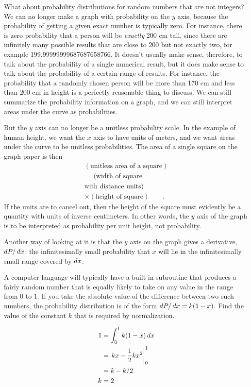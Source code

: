 What about probability distributions for random numbers that
are not integers? We can no longer make a graph with
probability on the $y$ axis, because the probability of
getting a given exact number is typically zero. For
instance, there is zero probability that a person will be
\emph{exactly} 200 cm tall, since there are
infinitely many possible results that are close to 200 but not
exactly two, for example 199.99999999687687658766.
It doesn't usually make sense, therefore, to talk
about the probability of a single numerical result, but it
does make sense to talk about the probability of a certain
range of results. For instance, the probability that a randomly
chosen person will be more than 170 cm and less than 200 cm
in height is a perfectly
reasonable thing to discuss. We can still summarize the
probability information on a graph, and we can still
interpret areas under the curve as probabilities.
%

But the $y$ axis can no longer be a unitless probability
scale. In the example of human height, we want the $x$
axis to have units of meters, and we want areas under the
curve to be unitless probabilities. The area of a single
square on the graph paper is then
\begin{align*}
 (\text{unitless area of a square})\\
         =  (\text{width of square}\\
             \text{with distance units}) \\
             \times (\text{height of square}) \qquad .
\end{align*}
If the units are to cancel out, then the height of the
square must evidently be a quantity with units of inverse
centimeters. In other words, the $y$ axis of the graph is to be
interpreted as probability per unit height, not probability.

Another way of looking at it is that the $y$ axis on the graph
gives a derivative, $\mathop{d\!} P/\mathop{d\!} x$: the infinitesimally small
probability that $x$ will lie in the infinitesimally small
range covered by $\mathop{d\!} x$.

\begin{eg}\label{eg:random-diff}
\egquestion A computer language will typically have a built-in
subroutine that produces a fairly random number that is equally
likely to take on any value in the range from 0 to 1. If you
take the absolute value of the difference between two such
numbers, the probability distribution is of the form
$\mathop{d\!} P/\mathop{d\!} x=k(1-x)$. Find the value of the constant $k$
that is required by normalization.

\eganswer
\begin{align*}
  1 &= \int_0^1 k(1-x)\mathop{d\!} x \\
    &= \left.kx-\frac{1}{2}kx^2\right|_0^1 \\
    &= k-k/2 \\
  k &= 2
\end{align*}
\end{eg}

